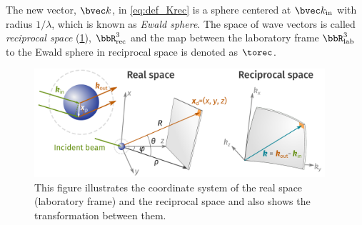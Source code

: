 

The new vector, $\bvec k$, in \cref{eq:def_Krec} is a sphere centered at $\bvec k_\text{in}$ with
radius $1/\lambda$, which is known as \emph{Ewald sphere}.  The space of wave vectors is called
\emph{reciprocal space} (\cref{fig:lab_frame}), $\bbR_\text{rec}^3$ and the map between the laboratory frame
$\bbR_\text{lab}^3$ to the Ewald sphere in reciprocal space is denoted as $\torec$.

\begin{figure}[htpb]
    \centering
    \includegraphics[width=0.96\textwidth]{pic/ill_lab.pdf}
    \caption[Lab coordinate system]{This figure illustrates the coordinate system of the real
        space (laboratory frame) and the reciprocal space and also shows the transformation between them.}
    \label{fig:lab_frame}
\end{figure}
